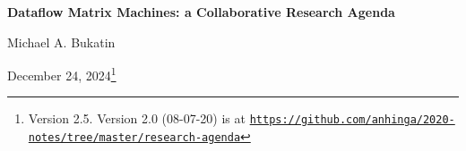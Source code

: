 \documentclass{article}
\begin{document}
\renewcommand{\abstractname}{\vspace{-\baselineskip}}

\renewcommand\contentsname{\vspace{-\baselineskip}}


\begin{center}

{\bf Dataflow Matrix Machines:  a Collaborative Research Agenda}
                                   



\vspace{0.1in}
Michael A. Bukatin


\vspace{0.085in}
December 24, 2024\footnote{Version 2.5. Version 2.0 (08-07-20) is at
\href{https://github.com/anhinga/2020-notes/tree/master/research-agenda}
{\tt https://github.com/anhinga/2020-notes/tree/master/research-agenda}}

\end{center}
\end{document}
